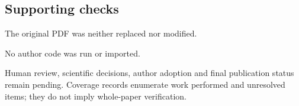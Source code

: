 \documentclass[10pt]{article}
\begin{document}
\subsection*{Supporting checks}
The original PDF was neither replaced nor modified.\par
No author code was run or imported.\par
Human review, scientific decisions, author adoption and final publication status remain pending. Coverage records enumerate work performed and unresolved items; they do not imply whole-paper verification.\par
\end{document}
